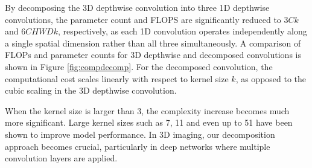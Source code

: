 By decomposing the 3D depthwise convolution into three 1D depthwise convolutions, the parameter count and FLOPS are significantly reduced to $3Ck$ and $6CHWDk$, respectively, as each 1D convolution operates independently along a single spatial dimension rather than all three simultaneously. A comparison of FLOPs and parameter counts for 3D depthwise and decomposed convolutions is shown in Figure \ref{fig:compdecomp}. For the decomposed convolution, the computational cost scales linearly with respect to kernel size $k$, as opposed to the cubic scaling in the 3D depthwise convolution. 

When the kernel size is larger than 3, the complexity increase becomes much more significant. Large kernel sizes such as 7, 11 \cite{liu2022convnet, yu2024inceptionnext} and even up to 51 \cite{ding2022scaling, liu2022more} have been shown to improve model performance. In 3D imaging, our decomposition approach becomes crucial, particularly in deep networks where multiple convolution layers are applied. 

%


